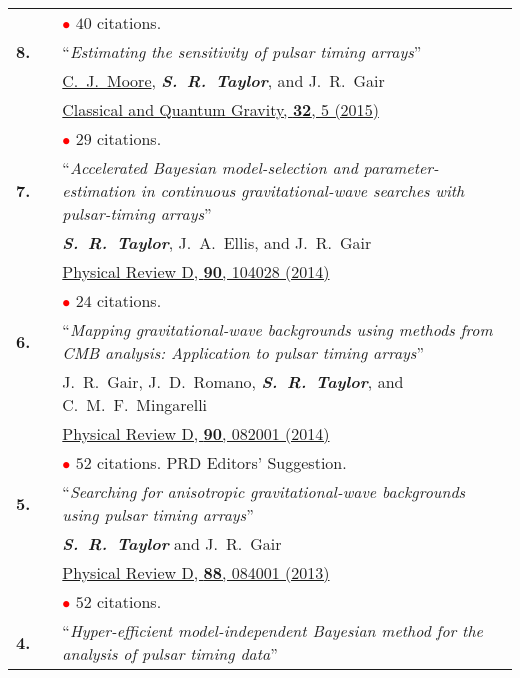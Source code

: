 \documentclass[11pt,letterpaper,sans]{moderncv}
\begin{document}
{\begin{longtable}{rp{0.3cm}p{15.8cm}}
&& \textcolor{red}{$\bullet$} $40$ citations. \vspace{0.09cm}\\
\textbf{8.} & & ``\textit{Estimating the sensitivity of pulsar timing arrays}'' \\ 
&& \underline{C.~J.~Moore}, \textit{\textbf{S.~R.~Taylor}}, and J.~R.~Gair \\ 
&& \href{http://iopscience.iop.org/article/10.1088/0264-9381/32/5/055004/meta}{{\color{color1} Classical and Quantum Gravity, \textbf{32}, 5 (2015)}} \\
&& \textcolor{red}{$\bullet$} $29$ citations. \vspace{0.09cm}\\
\textbf{7.} & & ``\textit{Accelerated Bayesian model-selection and parameter-estimation in continuous gravitational-wave searches with pulsar-timing arrays}'' \\ 
&& \textit{\textbf{S.~R.~Taylor}}, J.~A.~Ellis, and J.~R.~Gair \\ 
&& \href{http://journals.aps.org/prd/abstract/10.1103/PhysRevD.90.104028}{{\color{color1} Physical Review D, \textbf{90}, 104028 (2014)}} \\
&& \textcolor{red}{$\bullet$} $24$ citations. \vspace{0.09cm}\\
\textbf{6.} & & ``\textit{Mapping gravitational-wave backgrounds using methods from CMB analysis: Application to pulsar timing arrays}'' \\ 
&& J.~R.~Gair, J.~D.~Romano, \textit{\textbf{S.~R.~Taylor}}, and C.~M.~F.~Mingarelli \\ 
&& \href{http://journals.aps.org/prd/abstract/10.1103/PhysRevD.90.082001}{{\color{color1} Physical Review D, \textbf{90}, 082001 (2014)}} \\
&& \textcolor{red}{$\bullet$} $52$ citations. PRD Editors' Suggestion.\vspace{0.09cm}\\
\textbf{5.} & & ``\textit{Searching for anisotropic gravitational-wave backgrounds using pulsar timing arrays}'' \\ 
&& \textit{\textbf{S.~R.~Taylor}} and J.~R.~Gair \\ 
&& \href{http://journals.aps.org/prd/abstract/10.1103/PhysRevD.88.084001}{{\color{color1} Physical Review D, \textbf{88}, 084001 (2013)}} \\
&& \textcolor{red}{$\bullet$} $52$ citations. \vspace{0.09cm}\\
\textbf{4.} & & ``\textit{Hyper-efficient model-independent Bayesian method for the analysis of pulsar timing data}'' \\ 

\end{longtable}}
\end{document}
